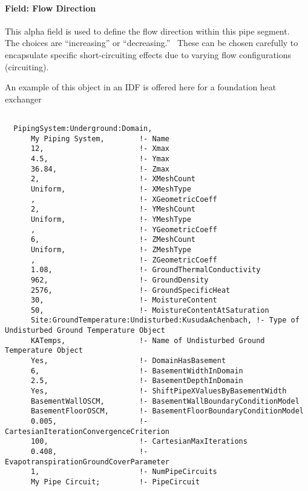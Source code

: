 \paragraph{Field: Flow Direction}\label{field-flow-direction}

This alpha field is used to define the flow direction within this pipe segment.~ The choices are ``increasing'' or ``decreasing.''~ These can be chosen carefully to encapsulate specific short-circuiting effects due to varying flow configurations (circuiting).

An example of this object in an IDF is offered here for a foundation heat exchanger

\begin{lstlisting}

  PipingSystem:Underground:Domain,
      My Piping System,        !- Name
      12,                      !- Xmax
      4.5,                     !- Ymax
      36.84,                   !- Zmax
      2,                       !- XMeshCount
      Uniform,                 !- XMeshType
      ,                        !- XGeometricCoeff
      2,                       !- YMeshCount
      Uniform,                 !- YMeshType
      ,                        !- YGeometricCoeff
      6,                       !- ZMeshCount
      Uniform,                 !- ZMeshType
      ,                        !- ZGeometricCoeff
      1.08,                    !- GroundThermalConductivity
      962,                     !- GroundDensity
      2576,                    !- GroundSpecificHeat
      30,                      !- MoistureContent
      50,                      !- MoistureContentAtSaturation
      Site:GroundTemperature:Undisturbed:KusudaAchenbach, !- Type of Undisturbed Ground Temperature Object
      KATemps,                 !- Name of Undisturbed Ground Temperature Object
      Yes,                     !- DomainHasBasement
      6,                       !- BasementWidthInDomain
      2.5,                     !- BasementDepthInDomain
      Yes,                     !- ShiftPipeXValuesByBasementWidth
      BasementWallOSCM,        !- BasementWallBoundaryConditionModel
      BasementFloorOSCM,       !- BasementFloorBoundaryConditionModel
      0.005,                   !- CartesianIterationConvergenceCriterion
      100,                     !- CartesianMaxIterations
      0.408,                   !- EvapotranspirationGroundCoverParameter
      1,                       !- NumPipeCircuits
      My Pipe Circuit;         !- PipeCircuit


\end{lstlisting}
